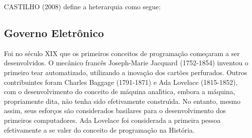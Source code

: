 \documentclass[
12pt,		%
openright,	%
twoside,  %
a4paper,			%
chapter=TITLE,		%
english,			%
french,				%
spanish,			%
brazil				%
]{USPSC-classe/USPSC}
\begin{document}
\noindent\begin{center}\mbox{\centering{}}\end{center}


 CASTILHO (2008) define a heterarquia como segue:











\noindent\begin{center}\mbox{\centering{}}\end{center}


\subsection[Governo Eletr\^onico]{Governo Eletr\^onico}\label{Governo Eletr\^onico}
Foi no s\'eculo XIX que os primeiros conceitos de programa\c{c}\~ao come\c{c}aram a ser desenvolvidos. O mec\^anico franc\^es Joseph-Marie Jacquard (1752-1854) inventou o primeiro tear automatizado, utilizando a inova\c{c}\~ao dos cart\~oes perfurados. Outros contribuintes foram Charles Baggage (1791-1871) e Ada Lovelace (1815-1852), com o desenvolvimento do conceito de m\'aquina anal\'{\i}tica, embora a m\'aquina, propriamente dita, n\~ao tenha sido efetivamente constru\'{\i}da. No entanto, mesmo assim, seus esfor\c{c}os s\~ao considerados basilares para o desenvolvimento dos primeiros computadores. Ada Lovelace foi considerada a primeira pessoa efetivamente a se valer do conceito de programa\c{c}\~ao na Hist\'oria.
\end{document}
